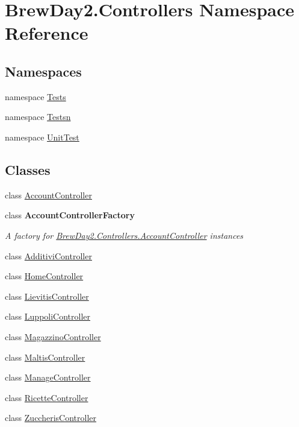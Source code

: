 \hypertarget{namespace_brew_day2_1_1_controllers}{}\section{Brew\+Day2.\+Controllers Namespace Reference}
\label{namespace_brew_day2_1_1_controllers}
\subsection*{Namespaces}
\begin{DoxyCompactItemize}
\item 
namespace \mbox{\hyperlink{namespace_brew_day2_1_1_controllers_1_1_tests}{Tests}}
\item 
namespace \mbox{\hyperlink{namespace_brew_day2_1_1_controllers_1_1_testsn}{Testsn}}
\item 
namespace \mbox{\hyperlink{namespace_brew_day2_1_1_controllers_1_1_unit_test}{Unit\+Test}}
\end{DoxyCompactItemize}
\subsection*{Classes}
\begin{DoxyCompactItemize}
\item 
class \mbox{\hyperlink{class_brew_day2_1_1_controllers_1_1_account_controller}{Account\+Controller}}
\item 
class {\bfseries Account\+Controller\+Factory}
\begin{DoxyCompactList}\small\item\em A factory for \mbox{\hyperlink{class_brew_day2_1_1_controllers_1_1_account_controller}{Brew\+Day2.\+Controllers.\+Account\+Controller}} instances\end{DoxyCompactList}\item 
class \mbox{\hyperlink{class_brew_day2_1_1_controllers_1_1_additivi_controller}{Additivi\+Controller}}
\item 
class \mbox{\hyperlink{class_brew_day2_1_1_controllers_1_1_home_controller}{Home\+Controller}}
\item 
class \mbox{\hyperlink{class_brew_day2_1_1_controllers_1_1_lievitis_controller}{Lievitis\+Controller}}
\item 
class \mbox{\hyperlink{class_brew_day2_1_1_controllers_1_1_luppoli_controller}{Luppoli\+Controller}}
\item 
class \mbox{\hyperlink{class_brew_day2_1_1_controllers_1_1_magazzino_controller}{Magazzino\+Controller}}
\item 
class \mbox{\hyperlink{class_brew_day2_1_1_controllers_1_1_maltis_controller}{Maltis\+Controller}}
\item 
class \mbox{\hyperlink{class_brew_day2_1_1_controllers_1_1_manage_controller}{Manage\+Controller}}
\item 
class \mbox{\hyperlink{class_brew_day2_1_1_controllers_1_1_ricette_controller}{Ricette\+Controller}}
\item 
class \mbox{\hyperlink{class_brew_day2_1_1_controllers_1_1_zuccheris_controller}{Zuccheris\+Controller}}
\end{DoxyCompactItemize}
